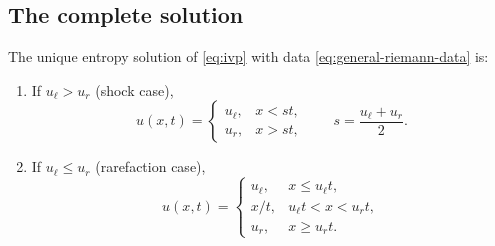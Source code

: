 \subsection{The complete solution}
\label{subsec:riemann-complete}

\begin{theorem}
\label{thm:riemann-solution}
The unique entropy solution of \eqref{eq:ivp} with data
\eqref{eq:general-riemann-data} is:
\begin{enumerate}
  \item[\textup{(a)}] If $u_\ell > u_r$ (shock case),
  \begin{equation}
    \label{eq:riemann-shock}
    u(x,t) = \begin{cases} u_\ell, & x < st, \\ u_r, & x > st, \end{cases}
    \qquad s = \frac{u_\ell+u_r}{2}.
  \end{equation}
  \item[\textup{(b)}] If $u_\ell \leq u_r$ (rarefaction case),
  \begin{equation}
    \label{eq:riemann-rarefaction}
    u(x,t) = \begin{cases}
      u_\ell, & x \le u_\ell t, \\
      x/t, & u_\ell t < x < u_r t, \\
      u_r, & x \ge u_r t.
    \end{cases}
  \end{equation}
\end{enumerate}
\end{theorem}

